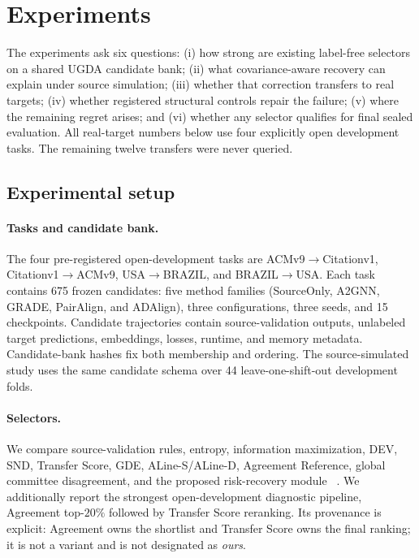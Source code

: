 \section{Experiments}
\label{sec:experiments}

The experiments ask six questions: (i) how strong are existing label-free
selectors on a shared UGDA candidate bank; (ii) what covariance-aware recovery
can explain under source simulation; (iii) whether that correction transfers
to real targets; (iv) whether registered structural controls repair the
failure; (v) where the remaining regret arises; and (vi) whether any selector
qualifies for final sealed evaluation. All real-target numbers below use four
explicitly open development tasks. The remaining twelve transfers were never
queried.

\subsection{Experimental setup}

\paragraph{Tasks and candidate bank.}
The four pre-registered open-development tasks are
ACMv9$\rightarrow$Citationv1, Citationv1$\rightarrow$ACMv9,
USA$\rightarrow$BRAZIL, and BRAZIL$\rightarrow$USA. Each task contains 675
frozen candidates: five method families (SourceOnly, A2GNN, GRADE, PairAlign,
and ADAlign), three configurations, three seeds, and 15 checkpoints.
Candidate trajectories contain source-validation outputs, unlabeled target
predictions, embeddings, losses, runtime, and memory metadata. Candidate-bank
hashes fix both membership and ordering. The source-simulated study uses the
same candidate schema over 44 leave-one-shift-out development folds.

\paragraph{Selectors.}
We compare source-validation rules, entropy, information maximization, DEV,
SND, Transfer Score, GDE, ALine-S/ALine-D, Agreement Reference, global
committee disagreement, and the proposed \method risk-recovery module
~\citep{you2019dev,saito2021tunerightwayunsupervised,
yang2023transferscore,jiang2021disagreement,baek2022agreement}. We additionally
report the strongest open-development diagnostic pipeline, Agreement
top-$20\%$ followed by Transfer Score reranking. Its provenance is explicit:
Agreement owns the shortlist and Transfer Score owns the final ranking; it is
not a \method variant and is not designated as \emph{ours}.

